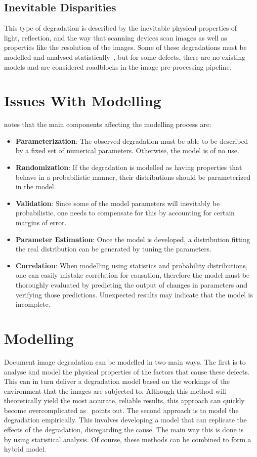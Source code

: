 \documentclass[a4paper, 12pt]{report}
\begin{document}
\subsection{Inevitable Disparities}
This type of degradation is described by the inevitable physical properties of light, reflection, and the way that scanning devices scan images as well as properties like the resolution of the images. Some of these degradations must be modelled and analysed statistically~\cite{Baird2007}, but for some defects, there are no existing models and are considered roadblocks in the image pre-processing pipeline.

\section{Issues With Modelling}
\cite{Baird2007} notes that the main components affecting the modelling process are:
\begin{itemize}
    \item \textbf{Parameterization}: The observed degradation must be able to be described by a fixed set of numerical parameters. Otherwise, the model is of no use.
    \item \textbf{Randomization}: If the degradation is modelled as having properties that behave in a probabilistic manner, their distributions should be parameterized in the model.
    \item \textbf{Validation}: Since some of the model parameters will inevitably be probabilistic, one needs to compensate for this by accounting for certain margins of error.
    \item \textbf{Parameter Estimation}: Once the model is developed, a distribution fitting the real distribution can be generated by tuning the parameters.
    \item \textbf{Correlation}: When modelling using statistics and probability distributions, one can easily mistake correlation for causation, therefore the model must be thoroughly evaluated by predicting the output of changes in parameters and verifying those predictions. Unexpected results may indicate that the model is incomplete.
\end{itemize}

\section{Modelling}
Document image degradation can be modelled in two main ways. The first is to analyse and model the physical properties of the factors that cause these defects. This can in turn deliver a degradation model based on the workings of the environment that the images are subjected to. Although this method will theoretically yield the most accurate, reliable results, this approach can quickly become overcomplicated as~\cite{Baird2007} points out. The second approach is to model the degradation empirically. This involves developing a model that can replicate the effects of the degradation, disregarding the cause. The main way this is done is by using statistical analysis. Of course, these methods can be combined to form a hybrid model.
\end{document}
